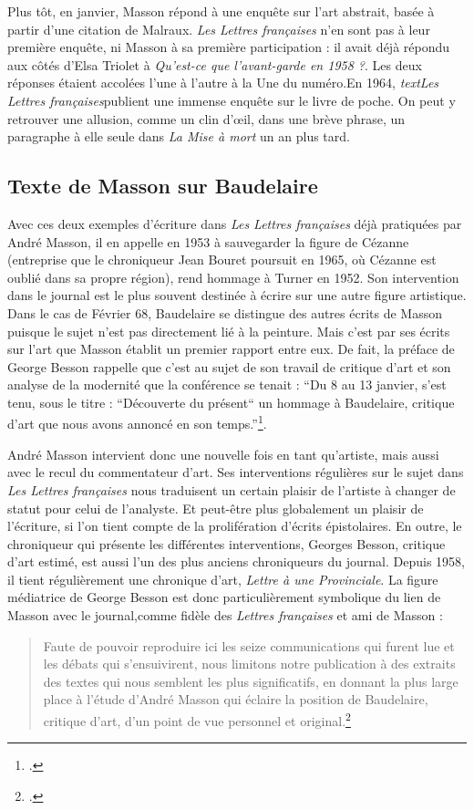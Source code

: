 	Plus tôt, en janvier, Masson répond à une enquête sur l’art abstrait, basée à partir d’une citation de Malraux. \emph{Les Lettres françaises} n’en sont pas à leur première enquête, ni Masson à sa première participation : il avait déjà répondu aux côtés d’Elsa Triolet à \emph{Qu’est-ce que l’avant-garde en 1958 ?}. Les deux réponses étaient accolées l'une à l'autre à la Une du numéro.En 1964, \emph{textLes Lettres françaises}publient une immense enquête sur le livre de poche. On peut y retrouver une allusion, comme un clin d’\oe{}il, dans une brève phrase, un paragraphe à elle seule dans \emph{La Mise à mort} un an plus tard.

\subsection{Texte de Masson sur Baudelaire}

Avec ces deux exemples d’écriture dans \emph{Les Lettres françaises} déjà pratiquées par André Masson, il en appelle en 1953 à sauvegarder la figure de Cézanne (entreprise que le chroniqueur Jean Bouret poursuit en 1965, où Cézanne est oublié dans sa propre région), rend hommage à Turner en 1952. Son intervention dans le journal est le plus souvent destinée à écrire sur une autre figure artistique. Dans le cas de Février 68, Baudelaire se distingue des autres écrits de Masson puisque le sujet n'est pas directement lié à la peinture. Mais c’est par ses écrits sur l’art que Masson établit un premier rapport entre eux. De fait, la préface de George Besson rappelle que c’est au sujet de son travail de critique d’art et son analyse de la modernité que la conférence se tenait : \enquote{Du 8 au 13 janvier, s’est tenu, sous le titre :  “Découverte du présent“ un hommage à Baudelaire, critique d’art que nous avons annoncé en son temps.}\footcite{baudelairepeintres}.


	 André Masson intervient donc une nouvelle fois en tant qu’artiste, mais aussi avec le recul du commentateur d’art. Ses interventions régulières sur le sujet dans \emph{Les Lettres françaises} nous traduisent un certain plaisir de l’artiste à changer de statut pour celui de l’analyste. Et peut-être plus globalement un plaisir de l’écriture, si l’on tient compte de la prolifération d’écrits épistolaires. En outre, le chroniqueur qui présente les différentes interventions, Georges Besson, critique d’art estimé, est aussi l’un des plus anciens chroniqueurs du journal. Depuis 1958, il tient régulièrement une chronique d’art, \emph{Lettre à une Provinciale}. La figure médiatrice de George Besson est donc particulièrement symbolique du lien de Masson avec le journal,comme fidèle des \emph{Lettres françaises} et ami de Masson :
\begin{quote}
Faute de pouvoir reproduire ici les seize communications qui furent lue et les débats qui s’ensuivirent, nous limitons notre publication à des extraits des textes qui nous semblent les plus significatifs, en donnant la plus large place à l’étude d’André Masson qui éclaire la position de Baudelaire, critique d’art, d’un point de vue personnel et original.\footcite{baudelairepeintres}\end{quote}

